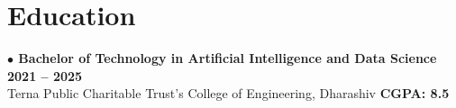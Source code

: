 \documentclass[a4paper,10pt]{article}
\begin{document}
\vspace{5pt}

\section{Education}
\noindent
\textbf{\normalsize $\bullet$ Bachelor of Technology in Artificial Intelligence and Data Science} \hfill \textbf{2021 -- 2025} \\
Terna Public Charitable Trust's College of Engineering, Dharashiv \hfill \textbf{CGPA: 8.5}
\end{document}

